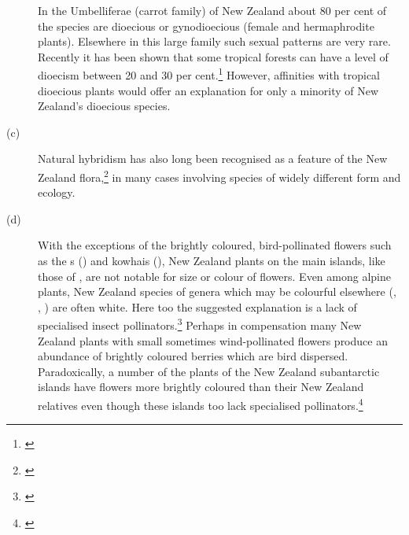 \begin{description}
In the Umbelliferae (carrot family) of New Zealand about 80 per cent of the species are dioecious or gynodioecious (female and hermaphrodite plants).
Elsewhere in this large family such sexual patterns are very rare.
Recently it has been shown that some tropical forests can have a level of dioecism between 20 and 30 per cent.\footnote{\cite{bawa1979breeding}}
However, affinities with tropical dioecious plants would offer an explanation for only a minority of New Zealand's dioecious species.
\item[{(c)}]Natural hybridism has also long been recognised as a feature of  the New Zealand flora,\footnote{\cite{connor1985biosystematics}} in many cases involving species of widely different form and ecology.
\item[{(d)}]With the exceptions of the brightly coloured, bird-pollinated flowers such as the s () and kowhais (), New Zealand plants on the main islands, like those of , are not notable for size or colour of flowers.
Even among alpine plants, New Zealand species of genera which may be colourful elsewhere (, , ) are often white.
Here too the suggested explanation is a lack of specialised insect pollinators.\footnote{\cite{primack1983insect}}
Perhaps in compensation many New Zealand plants with small sometimes wind-pollinated flowers produce an abundance of brightly coloured berries which are bird dispersed.
Paradoxically, a number of the plants of the New Zealand subantarctic islands have flowers more brightly coloured than their New Zealand relatives even though these islands too lack specialised pollinators.\footnote{\cite{godley1979flower}}
\end{description}

